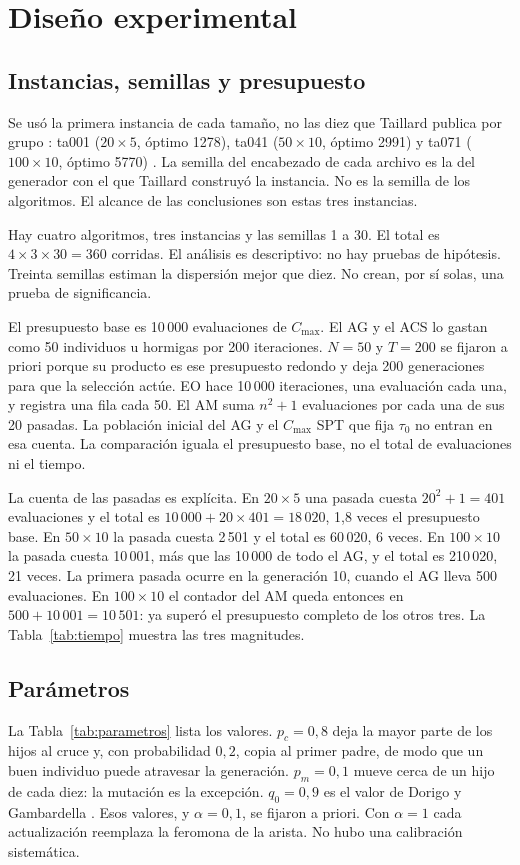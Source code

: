 \documentclass[journal]{IEEEtran}
\begin{document}
\section{Diseño experimental}\label{sec:diseno}
\subsection{Instancias, semillas y presupuesto}
Se usó la primera instancia de cada tamaño, no las diez que Taillard publica por grupo \cite{taillard_benchmarks_1993}: ta001 ($20\times5$, óptimo 1278), ta041 ($50\times10$, óptimo 2991) y ta071 ($100\times10$, óptimo 5770) \cite{taillard_bounds_2026}. La semilla del encabezado de cada archivo es la del generador con el que Taillard construyó la instancia. No es la semilla de los algoritmos. El alcance de las conclusiones son estas tres instancias.

Hay cuatro algoritmos, tres instancias y las semillas 1 a 30. El total es $4\times 3\times 30=360$ corridas. El análisis es descriptivo: no hay pruebas de hipótesis. Treinta semillas estiman la dispersión mejor que diez. No crean, por sí solas, una prueba de significancia.

El presupuesto base es 10\,000 evaluaciones de $C_{\max}$. El AG y el ACS lo gastan como 50 individuos u hormigas por 200 iteraciones. $N=50$ y $T=200$ se fijaron a priori porque su producto es ese presupuesto redondo y deja 200 generaciones para que la selección actúe. EO hace 10\,000 iteraciones, una evaluación cada una, y registra una fila cada 50. El AM suma $n^2+1$ evaluaciones por cada una de sus 20 pasadas. La población inicial del AG y el $C_{\max}$ SPT que fija $\tau_0$ no entran en esa cuenta. La comparación iguala el presupuesto base, no el total de evaluaciones ni el tiempo.

La cuenta de las pasadas es explícita. En $20\times5$ una pasada cuesta $20^2+1=401$ evaluaciones y el total es $10\,000+20\times401=18\,020$, 1,8 veces el presupuesto base. En $50\times10$ la pasada cuesta 2\,501 y el total es 60\,020, 6 veces. En $100\times10$ la pasada cuesta 10\,001, más que las 10\,000 de todo el AG, y el total es 210\,020, 21 veces. La primera pasada ocurre en la generación 10, cuando el AG lleva 500 evaluaciones. En $100\times10$ el contador del AM queda entonces en $500+10\,001=10\,501$: ya superó el presupuesto completo de los otros tres. La Tabla~\ref{tab:tiempo} muestra las tres magnitudes.

\subsection{Parámetros}
La Tabla~\ref{tab:parametros} lista los valores. $p_c=0{,}8$ deja la mayor parte de los hijos al cruce y, con probabilidad $0{,}2$, copia al primer padre, de modo que un buen individuo puede atravesar la generación. $p_m=0{,}1$ mueve cerca de un hijo de cada diez: la mutación es la excepción. $q_0=0{,}9$ es el valor de Dorigo y Gambardella \cite{dorigo_ant_1997}. Esos valores, y $\alpha=0{,}1$, se fijaron a priori. Con $\alpha=1$ cada actualización reemplaza la feromona de la arista. No hubo una calibración sistemática.
\end{document}
